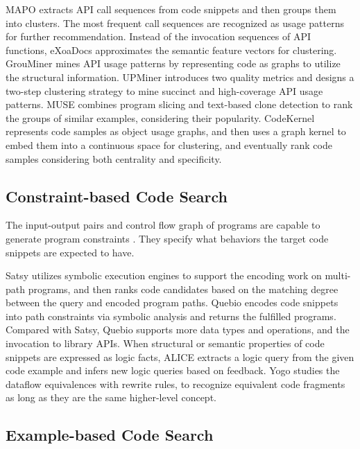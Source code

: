 \documentclass[conference]{IEEEtran}
\begin{document}
MAPO \cite{Zhong2009MAPOMA} extracts API call sequences from code snippets and then groups them into clusters. The most frequent call sequences are recognized as usage patterns for further recommendation. Instead of the invocation sequences of API functions, eXoaDocs \cite{Kim2010TowardsAI} approximates the semantic feature vectors for clustering. GrouMiner \cite{Nguyen2009GraphbasedMO} mines API usage patterns by representing code as graphs to utilize the structural information. UPMiner \cite{Wang2013MiningSA} introduces two quality metrics and designs a two-step clustering strategy to mine succinct and high-coverage API usage patterns. MUSE \cite{Moreno2015HowCI} combines program slicing and text-based clone detection to rank the groups of similar examples, considering their popularity. CodeKernel \cite{Gu2019CodeKernelAG} represents code samples as object usage graphs, and then uses a graph kernel to embed them into a continuous space for clustering, and eventually rank code samples considering both centrality and specificity.

\subsection{Constraint-based Code Search}

The input-output pairs and control flow graph of programs are capable to generate program constraints \cite{Stolee2014SolvingTS}. They specify what behaviors the target code snippets are expected to have.

Satsy \cite{Stolee2016CodeSW} utilizes symbolic execution engines to support the encoding work on multi-path programs, and then ranks code candidates based on the matching degree between the query and encoded program paths. Quebio \cite{Chen2020EnhancingEC} encodes code snippets into path constraints via symbolic analysis and returns the fulfilled programs. Compared with Satsy, Quebio supports more data types and operations, and the invocation to library APIs. When structural or semantic properties of code snippets are expressed as logic facts, ALICE \cite{Sivaraman2019ActiveIL} extracts a logic query from the given code example and infers new logic queries based on feedback. Yogo \cite{Premtoon2020SemanticCS} studies the dataflow equivalences with rewrite rules, to recognize equivalent code fragments as long as they are the same higher-level concept.

\subsection{Example-based Code Search}
\end{document}
